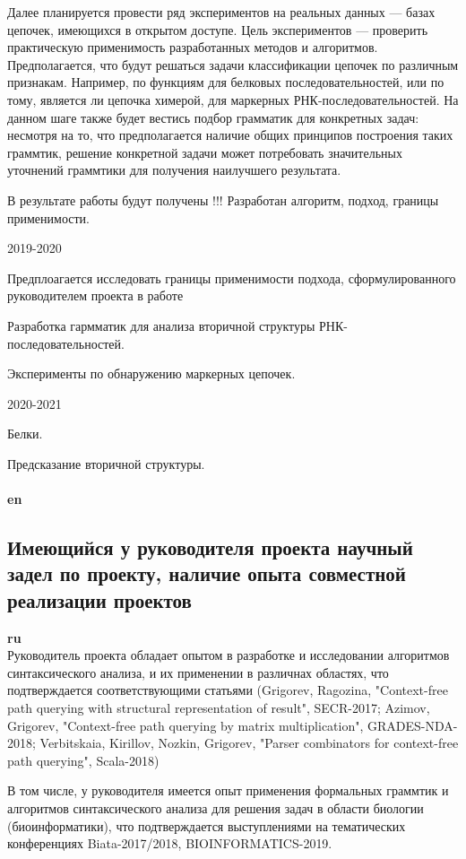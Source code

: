 \documentclass[12pt]{article}  %
\theoremstyle{remark}
\begin{document}
Далее планируется провести ряд экспериментов на реальных данных --- базах цепочек, имеющихся в открытом доступе.
Цель экспериментов --- проверить практическую применимость разработанных методов и алгоритмов.
Предполагается, что будут решаться задачи классификации цепочек по различным признакам.
Например, по функциям для белковых последовательностей, или по тому, является ли цепочка химерой, для маркерных РНК-последовательностей.
На данном шаге также будет вестись подбор грамматик для конкретных задач: несмотря на то, что предполагается наличие общих принципов построения таких граммтик, решение конкретной задачи может потребовать значительных уточнений граммтики для получения наилучшего результата.

В результате работы будут получены !!! Разработан алгоритм, подход, границы применимости.

2019-2020

Предплоагается исследовать границы применимости подхода, сформулированного руководителем проекта в работе

Разработка гармматик для анализа вторичной структуры РНК-последовательностей.

Эксперименты по обнаружению маркерных цепочек.


2020-2021

Белки.

Предсказание вторичной структуры.
\\
\\
\textbf{en}\\


\subsection{Имеющийся у руководителя проекта научный задел по проекту, наличие опыта совместной реализации проектов}

\textbf{ru}\\
Руководитель проекта обладает опытом в разработке и исследовании алгоритмов синтаксического анализа, и их применении в различнах областях, что подтверждается соответствующими статьями (Grigorev, Ragozina, "Context-free path querying with structural representation of result", SECR-2017; Azimov, Grigorev, "Context-free path querying by matrix multiplication", GRADES-NDA-2018; Verbitskaia, Kirillov, Nozkin, Grigorev, "Parser combinators for context-free path querying", Scala-2018)

В том числе, у руководителя имеется опыт применения формальных граммтик и алгоритмов синтаксического анализа для решения задач в области биологии (биоинформатики), что подтверждается выступлениями на тематических конференциях Biata-2017/2018, BIOINFORMATICS-2019.
\end{document}
